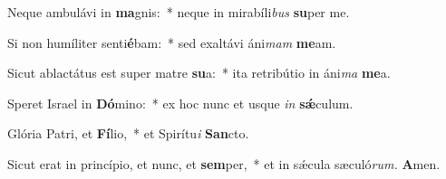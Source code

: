 \item Neque ambulávi in \textbf{ma}gnis:~* neque in mirabíli\textit{bus} \textbf{su}per me.
\item Si non humíliter senti\textbf{é}bam:~* sed exaltávi áni\textit{mam} \textbf{me}am.
\item Sicut ablactátus est super matre \textbf{su}a:~* ita retribútio in áni\textit{ma} \textbf{me}a.
\item Speret Israel in \textbf{Dó}mino:~* ex hoc nunc et usque \textit{in} \textbf{sǽ}culum.
\item Glória Patri, et \textbf{Fí}lio,~* et Spirítu\tinyhspace\textit{i} \textbf{San}cto.
\item Sicut erat in princípio, et nunc, et \textbf{sem}per,~* et in sǽcula sæculó\textit{rum.} \textbf{A}men.
